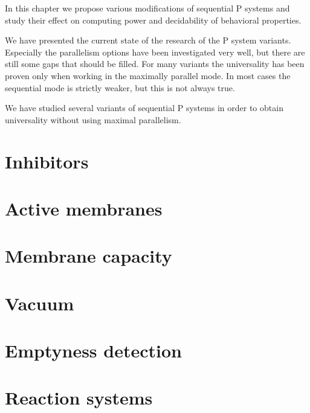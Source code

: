 In this chapter we propose various modifications of sequential P systems and study their effect on computing power and decidability of behavioral properties.

We have presented the current state of the research of the P system variants. Especially the parallelism options have been investigated very well, but there are still some gaps that should be filled. For many variants the universality has been proven only when working in the maximally parallel mode. In most cases the sequential mode is strictly weaker, but this is not always true.

We have studied several variants of sequential P systems in order to obtain universality without using maximal parallelism.

\section{Inhibitors} %
\label{sec:inhibitors}


\section{Active membranes} %
\label{sec:active_membranes}


\section{Membrane capacity} %
\label{sec:membrane_capacity}


\section{Vacuum} %
\label{sec:vacuum}


\section{Emptyness detection} %
\label{sec:emptyness_detection}


\section{Reaction systems} %
\label{sec:reaction_systems}

